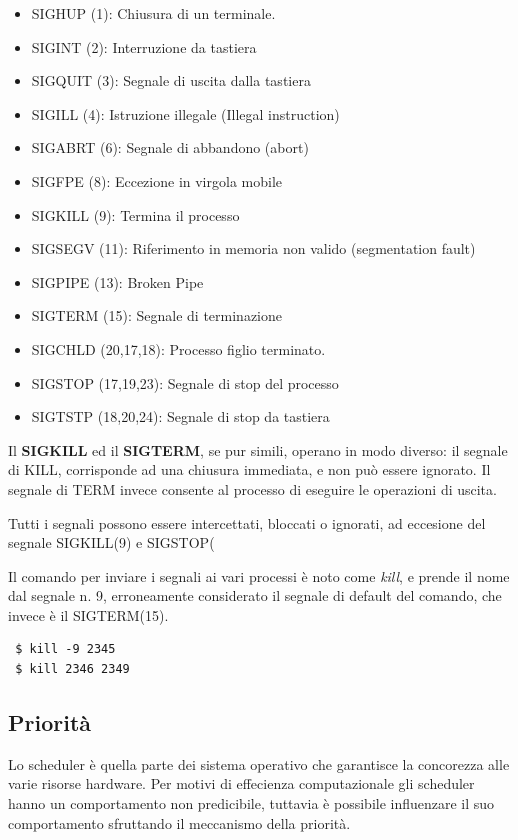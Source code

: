 \begin{itemize}
 \item SIGHUP (1): Chiusura di un terminale.
 \item SIGINT (2): Interruzione da tastiera
 \item SIGQUIT (3): Segnale di uscita dalla tastiera
 \item SIGILL (4): Istruzione illegale (Illegal instruction)
 \item SIGABRT (6): Segnale di abbandono (abort)
 \item SIGFPE (8): Eccezione in virgola mobile
 \item SIGKILL (9): Termina il processo
 \item SIGSEGV (11): Riferimento in memoria non valido (segmentation fault)
 \item SIGPIPE (13): Broken Pipe
 \item SIGTERM (15): Segnale di terminazione
 \item SIGCHLD (20,17,18): Processo figlio terminato.
 \item SIGSTOP (17,19,23): Segnale di stop del processo
 \item SIGTSTP (18,20,24): Segnale di stop da tastiera
\end{itemize}


Il \textbf{SIGKILL} ed il \textbf{SIGTERM}, se pur simili, operano in modo diverso: il segnale di KILL, corrisponde ad una chiusura immediata, e non può essere ignorato. Il segnale di TERM invece consente al processo di eseguire le operazioni di uscita.  

Tutti i segnali possono essere intercettati, bloccati o ignorati, ad eccesione del segnale SIGKILL(9) e SIGSTOP(

Il comando per inviare i segnali ai vari processi è noto come \textit{kill}, e prende il nome dal segnale n. 9, erroneamente considerato il segnale di default del comando, che invece è il SIGTERM(15).

\begin{verbatim}
 $ kill -9 2345
 $ kill 2346 2349
\end{verbatim}

\subsection{Priorità}

Lo scheduler è quella parte dei sistema operativo che garantisce la concorezza alle varie risorse hardware. Per motivi di effecienza computazionale gli scheduler hanno un comportamento non predicibile, tuttavia è possibile influenzare il suo comportamento sfruttando il meccanismo della priorità.

